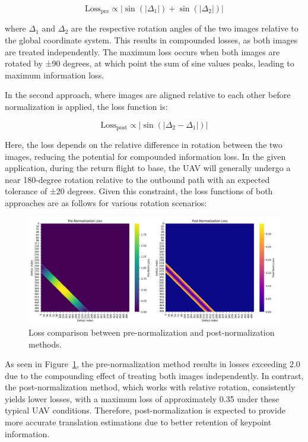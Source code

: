 \begin{equation}
\text{Loss}_{\text{pre}} \propto |\sin(|\Delta_1|) + \sin(|\Delta_2|)|
\end{equation}

where \( \Delta_1 \) and \( \Delta_2 \) are the respective rotation angles of the two images relative to the global coordinate system. This results in compounded losses, as both images are treated independently. The maximum loss occurs when both images are rotated by ±90 degrees, at which point the sum of sine values peaks, leading to maximum information loss.

In the second approach, where images are aligned relative to each other before normalization is applied, the loss function is:

\begin{equation}
\text{Loss}_{\text{post}} \propto |\sin(|\Delta_2 - \Delta_1|)|
\end{equation}


Here, the loss depends on the relative difference in rotation between the two images, reducing the potential for compounded information loss. In the given application, during the return flight to base, the UAV will generally undergo a near 180-degree rotation relative to the outbound path with an expected tolerance of ±20 degrees. Given this constraint, the loss functions of both approaches are as follows for various rotation scenarios:

\begin{figure}[H]
    \centering
    \includegraphics[width=\textwidth]{Chapter 4/Figs4/lossprevspost.png}
    \caption{Loss comparison between pre-normalization and post-normalization methods.}
    \label{fig:lossprevpost}
\end{figure}


As seen in Figure~\ref{fig:lossprevpost}, the pre-normalization method results in losses exceeding 2.0 due to the compounding effect of treating both images independently. In contrast, the post-normalization method, which works with relative rotation, consistently yields lower losses, with a maximum loss of approximately 0.35 under these typical UAV conditions. Therefore, post-normalization is expected to provide more accurate translation estimations due to better retention of keypoint information.




